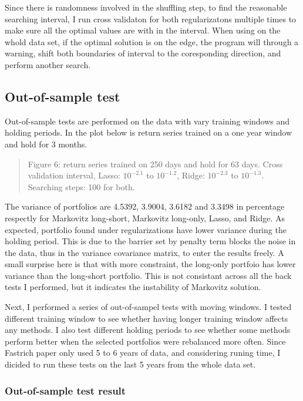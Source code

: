 \documentclass{article}
\newcommand{\ciapdf}[1]{\vspace*{-\parskip}\begin{center}\resizebox{0.75\textwidth}{!}{\texttt{[image: \#1]}}\end{center}}
\begin{document}
Since there is randomness involved in the shuffling step, to find the reasonable
searching interval, I run cross validaton for both regularizatons multiple times
to make sure all the optimal values are with in the interval. When using on
the whold data set, if the optimal solution is on the edge, the program will
through a warning, shift both boundaries of interval to the coresponding
direction, and perform another search.

\subsection*{Out-of-sample test}

Out-of-sample tests are performed on the data with vary training windows and
holding periods. In the plot below is return series trained on a one year
window and hold for 3 months.


\ciapdf{Figure_6T2.pdf}

\begin{quote}
Figure 6: return series trained on 250 days and hold for 63 days. Cross validation
interval, Lasso: $10^{-2.1}$ to $10^{-1.2}$, Ridge: $10^{-2.3}$ to $10^{-1.3}$.
Searching steps: 100 for both.
\end{quote}

The variance of portfolios are 4.5392, 3.9004, 3.6182 and 3.3498 in percentage
respectly
for Markovitz long-short, Markovitz long-only, Lasso, and Ridge. As expected,
portfolio found under regularizations have lower variance during the holding
period. This is due to the barrier set by penalty term blocks the noise in the
data, thus in the variance covariance matrix, to enter the results freely. A
small surprise here is that with more constraint, the long-only portfoio
has lower variance than the long-short portfolio. This is not consistant across
all the back tests I performed, but it indicates the instability of Markovitz
solution.

Next, I performed a series of out-of-sampel tests with moving windows. I tested
different training window to see whether having longer training window affects
any methods. I also test different holding periods to see whether some methods
perform better when the selected portfolios were rebalanced more often. Since
Fastrich paper only used 5 to 6 years of data, and considering runing time, I
dicided to run these tests on the last 5 years from the whole data set.


\subsubsection*{\centering{}Out-of-sample test result}
\end{document}
